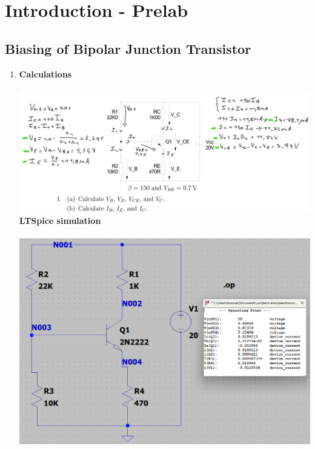 \documentclass{article}
\begin{document}
	
	
	\section{Introduction - Prelab}
	\subsection{Biasing of Bipolar Junction Transistor}
	\begin{enumerate}
		\item \textbf{Calculations}\\\\
		\includegraphics[scale=0.45]{prelab 3 ex 1 calc}\\
		\textbf{LTSpice simulation}\\\\
		\includegraphics[scale=0.6]{prelab 3 ex1 circuit}\\
	\end{enumerate}
 	\pagebreak
\end{document}
